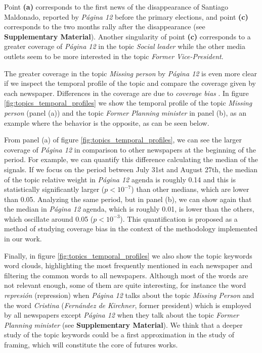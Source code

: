 \documentclass{bmcart}
\begin{document}
\par Point \textbf{(a)} corresponds  to the first news of the disappearance of Santiago Maldonado, reported by \emph{P\'agina 12} before the primary elections, and point \textbf{(c)} corresponds to  the two months rally after the disappearance  (see \textbf{Supplementary Material}). Another singularity of point \textbf{(c)} corresponds to a greater coverage of \emph{P\'agina 12} in the topic \emph{Social leader} while the other media outlets seem to be more interested in the topic \emph{Former Vice-President}.

\par The greater coverage in the topic \emph{Missing person} by \emph{P\'agina 12} is even more clear if we inspect the temporal profile of the topic and compare the coverage given by each newspaper. Differences in the coverage are due to  \emph{coverage bias} \cite{dallmann2015media}.  In figure \ref{fig:topics_temporal_profiles} we show the temporal profile of the topic \emph{Missing person} (panel (a)) and the topic \emph{Former Planning minister} in panel (b), as an example where the behavior is the opposite, as can be seen below.

\par From panel (a) of figure \ref{fig:topics_temporal_profiles}, we can see the larger coverage of \emph{P\'agina 12} in comparison to other newspapers at the beginning of the period. For example, we can quantify this difference calculating  the median of the signals. If we focus on the period between July 31st and August 27th, the median of the topic relative weight in \emph{P\'agina 12} agenda is roughly 0.14 and this is statistically significantly larger ($p < 10^{-7}$) than other medians, which are lower than 0.05.
Analyzing the same period, but in panel (b), we  can show again that the median in \emph{P\'agina 12} agenda, which is roughly 0.01, is lower than the others, which oscillate around 0.05 ($p<10^{-3}$).
This quantification is proposed as a method of studying coverage bias in the context of the methodology implemented in our work. 

\par Finally, in figure \ref{fig:topics_temporal_profiles} we also show the topic keywords word clouds, highlighting the most frequently mentioned in each newspaper and filtering the common words to all newspapers.
Although most of the words are not relevant enough, some of them are quite interesting, for instance the word \emph{represi\'on} (repression) when \emph{P\'agina 12} talks about the topic \emph{Missing Person} and the word \emph{Cristina} (\emph{Fern\'andez de Kirchner}, former president) which is employed by all newspapers except \emph{P\'agina 12} when they  talk about the topic \emph{Former Planning minister} (see \textbf{Supplementary Material}).
We think that a deeper study of the topic keywords could be a first approximation in the study of framing, which will constitute the core of futures works.
\end{document}
